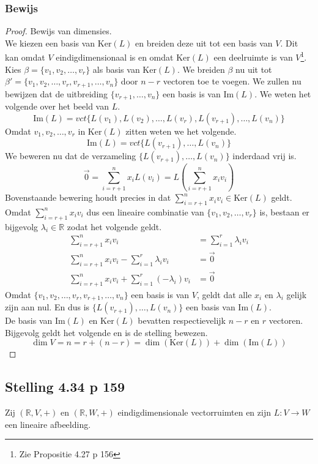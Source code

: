 \documentclass[lineaire_algebra_oplossingen.tex]{subfiles}
\begin{document}
\subsubsection*{Bewijs}
\begin{proof}
Bewijs van dimensies.\\
We kiezen een basis van $\text{Ker}(L)$ en breiden deze uit tot een basis van $V$. Dit kan omdat $V$ eindig\-dimensionaal is en omdat $\text{Ker}(L)$ een deelruimte is van $V$\footnote{Zie Propositie 4.27 p 156}. Kies $\beta = \{v_1,v_2,\ldots,v_r\}$ als basis van $\text{Ker}(L)$. We breiden $\beta$ nu uit tot $\beta'= \{v_1,v_2,\ldots,v_r,v_{r+1},\ldots,v_{n}\}$ door $n-r$ vectoren toe te voegen. 
We zullen nu bewijzen dat de uitbreiding $\{v_{r+1},\ldots,v_{n}\}$ een basis is van $\text{Im}(L)$. We weten het volgende over het beeld van $L$.
\[
\text{Im}(L) = vct\{L(v_1),L(v_2),\ldots,L(v_r),L(v_{r+1}),\ldots,L(v_{n})\}
\]
Omdat $v_1,v_2,\ldots,v_r$ in $\text{Ker}(L)$ zitten weten we het volgende.
\[
\text{Im}(L) = vct \{L(v_{r+1}),\ldots,L(v_{n})\}
\]
We beweren nu dat de verzameling $\{L(v_{r+1}),\ldots,L(v_{n})\}$ inderdaad vrij is.
\[
\vec{0}=\sum_{i=r+1}^nx_iL(v_i)=L\left(\sum_{i=r+1}^nx_iv_i\right)
\]
Bovenstaande bewering houdt precies in dat $\sum_{i=r+1}^nx_iv_i\in \text{Ker}(L)$ geldt.\\
Omdat $\sum_{i=r+1}^nx_iv_i$ dus een lineaire combinatie van $\{v_1,v_2,\ldots,v_r\}$ is, bestaan er bijgevolg $\lambda_i \in \mathbb{R}$ zodat het volgende geldt.
\begin{align*}
\sum_{i=r+1}^nx_iv_i &= \sum_{i=1}^r\lambda_iv_i \\
\sum_{i=r+1}^nx_iv_i - \sum_{i=1}^r\lambda_iv_i &= \vec{0} \\
\sum_{i=r+1}^nx_iv_i + \sum_{i=1}^r(-\lambda_i)v_i &= \vec{0}
\end{align*}
Omdat $\{v_1,v_2,\ldots,v_r,v_{r+1},\ldots,v_{n}\}$ een basis is van $V$, geldt dat alle $x_i$ en $\lambda_i$ gelijk zijn aan nul. En dus is $\{L(v_{r+1}),\ldots,L(v_{n})\}$ een basis van $\text{Im}(L)$.\\
De basis van $\text{Im}(L)$ en $\text{Ker}(L)$ bevatten respectievelijk $n-r$ en $r$ vectoren. Bijgevolg geldt het volgende en is de stelling bewezen.
\[
\dim V = n = r + (n-r) = \dim (\text{Ker}(L)) + \dim (\text{Im}(L))
\]
\end{proof}


\subsection{Stelling 4.34 p 159}
\label{4.34}
Zij $(\mathbb{R},V,+)$ en $(\mathbb{R},W,+)$ eindigdimensionale vectorruimten en zijn $L:V\rightarrow W$ een lineaire afbeelding.
\end{document}

